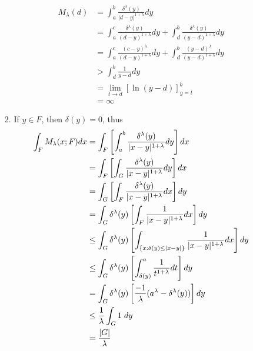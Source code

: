 \documentclass[a4paper,11pt]{article}
\begin{document}
\begin{enumerate}
\begin{enumerate}
\begin{enumerate}
						$$\begin{aligned}
						M_\lambda (d)
						&= \int_a^b \frac{\delta^\lambda (y)}{|d - y|^{1+\lambda}} dy\\
						&= \int_a^c \frac{\delta^\lambda (y)}{(d - y)^{1+\lambda}} dy + \int_d^b \frac{\delta^\lambda (y)}{(y - d)^{1+\lambda}} dy\\
						&= \int_a^c \frac{(c-y)^\lambda}{(d-y)^{1+\lambda}} dy + \int_d^b \frac{(y-d)^{\lambda}}{(y-d)^{1+\lambda}}dy\\
						&> \int_d^b \frac{1}{y-d} dy\\
						&= \underset{t \to d}{\lim} \left[  \ln (y-d) \right]_{y=t}^{b}\\
						&= \infty
						\end{aligned}$$

					\item
						If $y \in F$, then $\delta(y) = 0$, thus
		 				$$\begin{aligned}
		 				\int_F M_\lambda (x;F) dx
		 				&= \int_F \left[ \int_a^b \frac{\delta^\lambda(y)}{|x-y|^{1+\lambda}} dy \right] dx\\
		 				&= \int_F \left[ \int_G \frac{\delta^\lambda(y)}{|x-y|^{1+\lambda}} dy \right] dx\\
		 				&= \int_G \left[ \int_F \frac{\delta^\lambda(y)}{|x-y|^{1+\lambda}} dx \right] dy\\
		 				&= \int_G \delta^\lambda(y) \left[ \int_F \frac{1}{|x-y|^{1+\lambda}} dx \right] dy\\
		 				&\leq \int_G \delta^\lambda(y) \left[ \int_{\{ x: \delta(y) \leq |x-y| \}} \frac{1}{|x-y|^{1+\lambda}} dx \right] dy\\
		 				&\leq \int_G \delta^\lambda(y) \left[ \int_{\delta(y)}^a \frac{1}{t^{1+\lambda}} dt \right] dy\\
		 				&= \int_G \delta^\lambda(y) \left[ \frac{-1}{\lambda} (a^\lambda - \delta^\lambda (y)) \right] dy\\
		 				&\leq \frac{1}{\lambda} \int_G 1 \hspace{0.1cm} dy \\
		 				&= \frac{|G|}{\lambda}
		 				\end{aligned}$$

				\end{enumerate}

 		\end{enumerate}






\end{enumerate}
\end{document}
